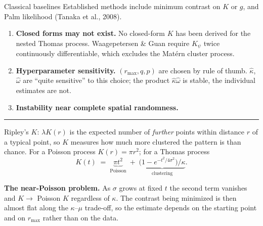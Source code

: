 \documentclass[aspectratio=169,10pt]{beamer}
\begin{document}
\begin{frame}{Classical baselines}
Established methods include minimum contrast on $K$ or $g$, and Palm likelihood
(Tanaka et al., 2008).
\vspace{4pt}
\begin{enumerate}
  \item \textbf{Closed forms may not exist.}
        No closed-form $K$ has been derived for the nested Thomas process.
        Waagepetersen \& Guan require $K_\psi$ twice continuously
        differentiable, which excludes the Mat\'ern cluster process.
  \item \textbf{Hyperparameter sensitivity.}
        $(r_{\max}, q, p)$ are chosen by rule of thumb.
        $\hat\kappa$, $\hat\omega$ are ``quite sensitive'' to this
        choice; the product $\hat\kappa\hat\omega$ is stable, the individual
        estimates are not.
  \item \textbf{Instability near complete spatial randomness.}
\end{enumerate}
\vspace{6pt}
\hrule
\vspace{4pt}
{\footnotesize
Ripley's $K$: $\lambda K(r)$ is the expected number of \emph{further} points
within distance $r$ of a typical point, so $K$ measures how much more clustered
the pattern is than chance. For a Poisson process $K(r) = \pi r^2$; for a
Thomas process
\[
K(t) \;=\; \underbrace{\pi t^2}_{\text{Poisson}} \;+\;
           \underbrace{\bigl(1 - e^{-t^2/4\sigma^2}\bigr)/\kappa}_{\text{clustering}} .
\]
\vspace{-4pt}

\textbf{The near-Poisson problem.} As $\sigma$ grows at fixed $t$ the second
term vanishes and $K \to$ Poisson $K$ \alert{regardless of $\kappa$}. The
contrast being minimized is then almost flat along the $\kappa$--$\mu$
trade-off, so the estimate depends on the starting point and on $r_{\max}$
rather than on the data.}
\end{frame}
\end{document}
